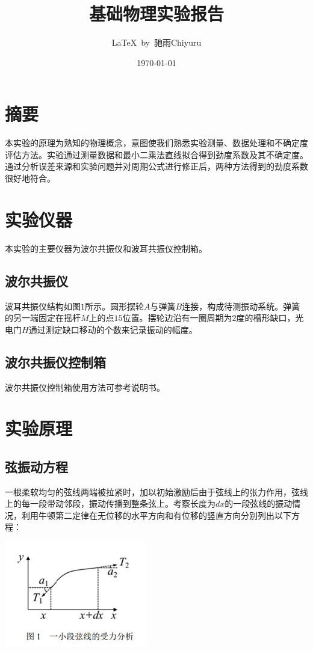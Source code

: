 \documentclass[UTF8]{ctexart}
\title{基础物理实验报告}
\author{\LaTeX\ by\ 驰雨Chiyuru}
\date{\today}
\begin{document}
\fancyfoot[C]{\thepage}

\maketitle
\tableofcontents
\newpage

\section{摘要}
本实验的原理为熟知的物理概念，意图使我们熟悉实验测量、数据处理和不确定度评估方法。实验通过测量数据和最小二乘法直线拟合得到劲度系数及其不确定度。通过分析误差来源和实验问题并对周期公式进行修正后，两种方法得到的劲度系数很好地符合。\cite{王合英2018自主探究实验对学生综合素质和创新能力的培养}


\section{实验仪器}
本实验的主要仪器为波尔共振仪和波耳共振仪控制箱。

\subsection{波尔共振仪}
波耳共振仪结构如图$1$所示。圆形摆轮$A$与弹簧$B$连接，构成待测振动系统。弹簧的另一端固定在摇杆$M$上的点$15$位置。摆轮边沿有一圈周期为$2$度的槽形缺口，光电门$H$通过测定缺口移动的个数来记录振动的幅度。


\subsection{波尔共振仪控制箱}
波尔共振仪控制箱使用方法可参考说明书。


\section{实验原理}

\subsection{弦振动方程}
一根柔软均匀的弦线两端被拉紧时，加以初始激励后由于弦线上的张力作用，弦线上的每一段带动邻段，振动传播到整条弦上。考察长度为$dx$的一段弦线的振动情况，利用牛顿第二定律在无位移的水平方向和有位移的竖直方向分别列出以下方程：

\begin{center}
    \includegraphics{picture/example.png}
\end{center}
\end{document}
